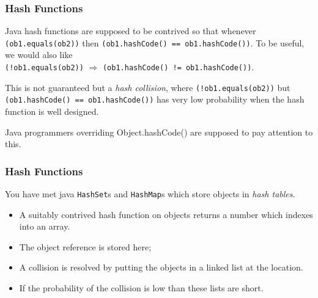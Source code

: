 \documentclass[10pt, hyperref={pdfpagelabels=false}]{beamer}
\begin{document}
\begin{frame}
\frametitle{Hash Functions}
Java hash functions are supposed to be contrived so that whenever \texttt{\color{blue}(ob1.equals(ob2))} then \texttt{\color{blue}(ob1.hashCode() == ob1.hashCode())}. To be useful, we would also like\\
\texttt{\color{blue}(!ob1.equals(ob2))} $\Rightarrow$ \texttt{\color{blue}(ob1.hashCode() != ob1.hashCode())}.

This is not guaranteed but a \emph{\color{blue}hash collision}, where \texttt{\color{blue}(!ob1.equals(ob2))} but \texttt{\color{blue}(ob1.hashCode() == ob1.hashCode())} has very low probability when the hash function is well designed.

Java programmers overriding Object.hashCode() are supposed to pay attention to this.
\end{frame}

\begin{frame}
\frametitle{Hash Functions}
You have met java \texttt{HashSet}s and \texttt{HashMap}s which store objects in \emph{hash tables}.
\begin{itemize}
\item A suitably contrived hash function on objects returns a number which indexes into an array.
\item The object reference is stored here;
\item A collision is resolved by putting the objects in a linked list at the location.
\item If the probability of the collision is low than these lists are short.
\end{itemize}
\end{frame}
\end{document}
